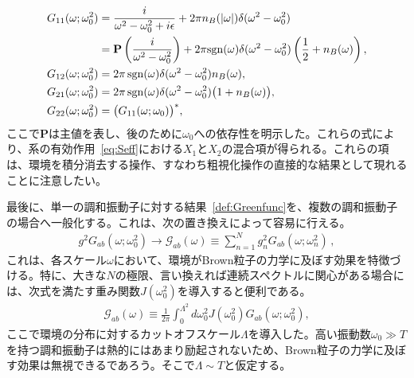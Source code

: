 \begin{align}
\begin{split}
 G_{11} (\omega;\omega_0^2)
 &=  \frac{i}{\omega^2-\omega_0^2 + i \epsilon}
 + 2 \pi n_B (|\omega|) \delta (\omega^2-\omega_0^2)\\
 &=\mathbf{P}\left(\frac{i}{\omega^{2}-\omega_{0}^{2}}\right)
+2\pi{\rm sgn}(\omega)\delta(\omega^{2}-\omega_{0}^{2})\left(\frac{1}{2}+n_B(\omega)\right)  ,
 \\
 G_{12} (\omega;\omega_0^2)
 &= 2 \pi\,\mathrm{sgn} (\omega) \delta (\omega^2-\omega_0^2) n_B (\omega) ,
 \\
 G_{21} (\omega;\omega_0^2)
 &= 2 \pi\,\mathrm{sgn} (\omega) \delta (\omega^2-\omega_0^2)
 \big( 1 + n_B (\omega) \big),
 \\
 G_{22} (\omega;\omega_0^2) &= \big( G_{11} (\omega;\omega_0) \big)^* ,
 \end{split}
 \label{def:Greenfunc}
\end{align}
ここで$\mathbf{P}$は主値を表し、後のために$\omega_0$への依存性を明示した。これらの式により、系の有効作用~\eqref{eq:Seff}における$X_1$と$X_2$の混合項が得られる。これらの項は、環境を積分消去する操作、すなわち粗視化操作の直接的な結果として現れることに注意したい。

\medskip
最後に、単一の調和振動子に対する結果~\eqref{def:Greenfunc}を、複数の調和振動子の場合へ一般化する。これは、次の置き換えによって容易に行える。
\begin{align}
 g^2G_{ab} (\omega;\omega_0^2)
  \to \mathcal{G}_{ab} (\omega)
  \equiv \sum_{n=1}^N g_n^2G_{ab} (\omega;\omega_n^2)\,,
\end{align}
これは、各スケール$\omega$において、環境がBrown粒子の力学に及ぼす効果を特徴づける。特に、大きな$N$の極限、言い換えれば連続スペクトルに関心がある場合には、次式を満たす重み関数$J(\omega_0^2)$を導入すると便利である。
\begin{align}
 \mathcal{G}_{ab} (\omega)
  \equiv \frac{1}{2\pi} \int_{0}^{\Lambda^{2}} d\omega_0^{2}
 J(\omega_0^2) G_{ab} (\omega;\omega_0^2),
 \label{eq:GreenMulticase}
\end{align}
ここで環境の分布に対するカットオフスケール$\Lambda$を導入した。高い振動数$\omega_0\gg T$を持つ調和振動子は熱的にはあまり励起されないため、Brown粒子の力学に及ぼす効果は無視できるであろう。そこで$\Lambda\sim T$と仮定する。

